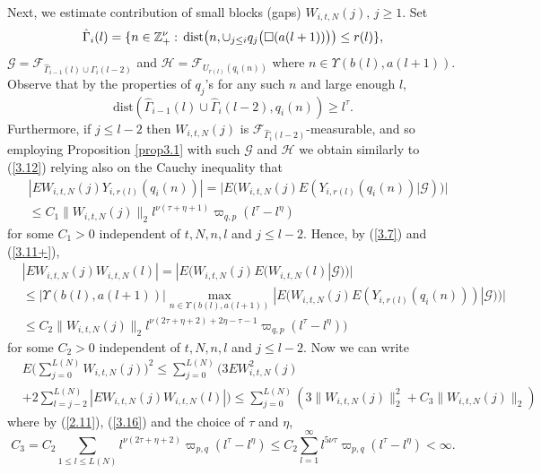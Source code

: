 Next, we estimate contribution of small blocks (gaps) $W_{i,t,N}(j),\, 
j\geq 1$. Set 
\[
\hat{{\Gamma}}_i(l)=\{ n\in{{\mathbb Z}}^\nu_+:\,\mbox{dist}\big(n,\cup_{j\leq i}q_j\big(
{{\large\square}}(a(l+1))\big)\big)\leq r(l)\},
\]
${{\mathcal G}}={{\mathcal F}}_{\hat{{\Gamma}}_{i-1}(l)\cup\hat{{\Gamma}}_i(l-2)}$ and 
${{\mathcal H}}={{\mathcal F}}_{U_{r(l)}(q_i(n))}$ where $n\in{{\Upsilon}}(b(l),a(l+1))$. Observe that by
the properties of $q_j$'s for any such $n$ and large enough $l$,
\[
\mbox{dist}(\hat{{\Gamma}}_{i-1}(l)\cup\hat{{\Gamma}}_i (l-2),q_i(n))\geq l^\tau.
\]
Furthermore, if $j\leq l-2$ then $W_{i,t,N}(j)$ is 
${{\mathcal F}}_{\hat{{\Gamma}}_i(l-2)}$-measurable, and so
employing Proposition \ref{prop3.1} with such ${{\mathcal G}}$ and ${{\mathcal H}}$ we obtain 
similarly to (\ref{3.12}) relying also on the Cauchy inequality that 
\begin{eqnarray}\label{3.15}
& |EW_{i,t,N}(j)Y_{i,r(l)}(q_i(n))|=\big\vert E\big(W_{i,t,N}(j)
E(Y_{i,r(l)}(q_i(n))|{{\mathcal G}})\big)\big\vert\\
&\leq C_1\| W_{i,t,N}(j)\|_2l^{\nu(\tau+\eta+1)}{{\varpi}}_{q,p}(l^\tau-l^\eta)
\nonumber\end{eqnarray}
for some $C_1>0$ independent of $t,N,n,l$ and $j\leq l-2$. Hence, by 
(\ref{3.7}) and (\ref{3.11+}),
\begin{eqnarray}\label{3.16}
&|EW_{i,t,N}(j)W_{i,t,N}(l)|=|E\big(W_{i,t,N}(j)E(W_{i,t,N}(l)|{{\mathcal G}})\big)|\\
&\leq |{{\Upsilon}}(b(l),a(l+1))|\max_{n\in{{\Upsilon}}(b(l),a(l+1))}
|E\big(W_{i,t,N}(j)E(Y_{i,r(l)}(q_i(n)))|{{\mathcal G}})\big)|\nonumber\\
&\leq C_2\| W_{i,t,N}(j)\|_2
l^{\nu(2\tau+\eta+2)+2\eta-\tau-1}{{\varpi}}_{q,p}(l^\tau-l^\eta)\big)\nonumber
\end{eqnarray}
for some $C_2>0$ independent of $t,N,n,l$ and $j\leq l-2$. 
Now we can write
\begin{eqnarray}\label{3.19}
&E\big(\sum_{j=0}^{L(N)}W_{i,t,N}(j)\big)^2\leq\sum_{j=0}^{L(N)}
\big(3EW^2_{i,t,N}(j)\\
&+2\sum_{l=j-2}^{L(N)}|EW_{i,t,N}(j)W_{i,t,N}(l)|\big)
\leq\sum_{j=0}^{L(N)}(3\| W_{i,t,N}(j)\|^2_2+C_3\| W_{i,t,N}(j)\|_2)
\nonumber\end{eqnarray}
where by (\ref{2.11}), (\ref{3.16}) and the choice of $\tau$ and $\eta$,
\[
C_3=C_2\sum_{1\leq l\leq L(N)}l^{\nu(2\tau+\eta+2)}{{\varpi}}_{p,q}(l^\tau-l^\eta)
\leq C_2\sum_{l=1}^\infty l^{5\nu\tau}{{\varpi}}_{p,q}(l^\tau-l^\eta)<\infty.
\]

